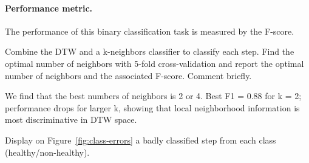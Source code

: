 \documentclass[11pt]{article}
\begin{document}
\paragraph{Performance metric.} The performance of this binary classification task is measured by the F-score.


\begin{exercise}
Combine the DTW and a k-neighbors classifier to classify each step. Find the optimal number of neighbors with 5-fold cross-validation and report the optimal number of neighbors and the associated F-score. Comment briefly.
\end{exercise}

\begin{solution}
    We find that the best numbers of neighbors is 2 or 4. 
    Best F1 = 0.88 for k = 2; performance drops for larger k, showing that local neighborhood information is most discriminative in DTW space.

\end{solution}

\newpage
\begin{exercise}\label{q:class-errors}
Display on Figure~\ref{fig:class-errors} a badly classified step from each class (healthy/non-healthy).
\end{exercise}

\end{document}
